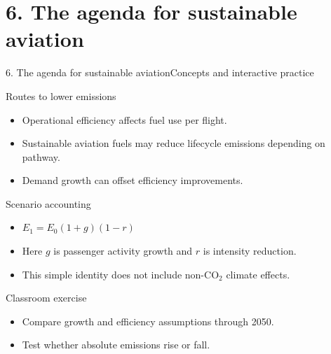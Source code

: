\documentclass[aspectratio=169,11pt]{beamer}
\begin{document}
\section{6. The agenda for sustainable aviation}
\begin{frame}{6. The agenda for sustainable aviation}\centering\Large Concepts and interactive practice\end{frame}
\begin{frame}{Routes to lower emissions}\begin{itemize}
\item Operational efficiency affects fuel use per flight.
\item Sustainable aviation fuels may reduce lifecycle emissions depending on pathway.
\item Demand growth can offset efficiency improvements.
\end{itemize}\end{frame}
\begin{frame}{Scenario accounting}\begin{itemize}
\item $E_1=E_0(1+g)(1-r)$
\item Here $g$ is passenger activity growth and $r$ is intensity reduction.
\item This simple identity does not include non-CO$_2$ climate effects.
\end{itemize}\end{frame}
\begin{frame}{Classroom exercise}\begin{itemize}
\item Compare growth and efficiency assumptions through 2050.
\item Test whether absolute emissions rise or fall.
\end{itemize}\end{frame}
\end{document}

